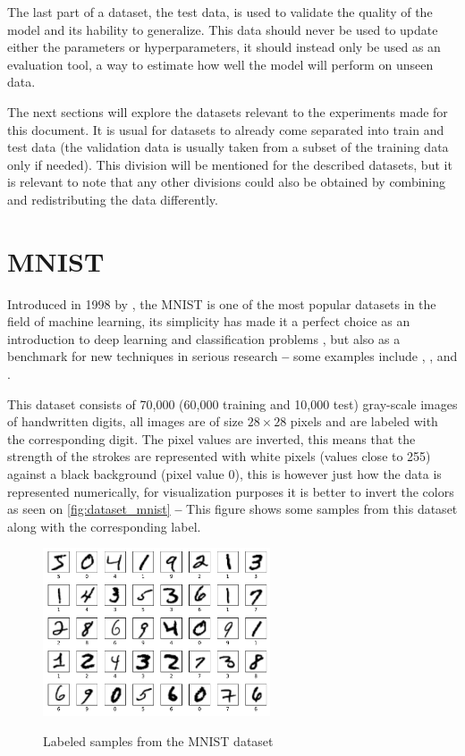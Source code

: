 The last part of a dataset, the test data, is used to validate the quality of the model and its hability to generalize. This data should never be used to update either the parameters or hyperparameters, it should instead only be used as an evaluation tool, a way to estimate how well the model will perform on unseen data.

The next sections will explore the datasets relevant to the experiments made for this document. It is usual for datasets to already come separated into train and test data (the validation data is usually taken from a subset of the training data only if needed). This division will be mentioned for the described datasets, but it is relevant to note that any other divisions could also be obtained by combining and redistributing the data differently.


\section{MNIST} \label{sec:mnist}
Introduced in 1998 by \textcite{mnist1998}, the \gls{MNIST} is one of the most popular datasets in the field of machine learning, its simplicity has made it a perfect choice as an introduction to deep learning and classification problems \cite{NN&DL2015}, but also as a benchmark for new techniques in serious research \textbf{--} some examples include \cite{dropout2012}, \cite{gans2014}, \cite{conditionalGAN2014} and \cite{adam2017}.

This dataset consists of 70,000 (60,000 training and 10,000 test) gray-scale images of handwritten digits, all images are of size $28{\times}28$ pixels and are labeled with the corresponding digit. The pixel values are inverted, this means that the strength of the strokes are represented with white pixels (values close to 255) against a black background (pixel value 0), this is however just how the data is represented numerically, for visualization purposes it is better to invert the colors as seen on \autoref{fig:dataset_mnist} \textbf{--} This figure shows some samples from this dataset along with the corresponding label.
\begin{figure}[hbt]
    \centering
    \caption{Labeled samples from the MNIST dataset}
    \includegraphics[width=0.6\textwidth]{chapters/Datasets/figures/MNIST.pdf}
    \label{fig:dataset_mnist}
\end{figure}


